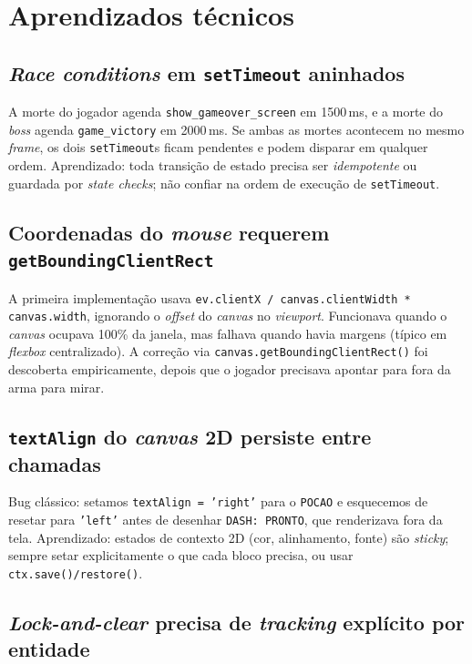 \section{Aprendizados técnicos}

\subsection{\emph{Race conditions} em \texttt{setTimeout} aninhados}

A morte do jogador agenda \texttt{show\_gameover\_screen} em 1500\,ms, e a morte
do \emph{boss} agenda \texttt{game\_victory} em 2000\,ms. Se ambas as mortes
acontecem no mesmo \emph{frame}, os dois \texttt{setTimeout}s ficam pendentes e
podem disparar em qualquer ordem. Aprendizado: toda transição de estado precisa
ser \emph{idempotente} ou guardada por \emph{state checks}; não confiar na ordem
de execução de \texttt{setTimeout}.

\subsection{Coordenadas do \emph{mouse} requerem \texttt{getBoundingClientRect}}

A primeira implementação usava \texttt{ev.clientX / canvas.clientWidth *
canvas.width}, ignorando o \emph{offset} do \emph{canvas} no \emph{viewport}.
Funcionava quando o \emph{canvas} ocupava 100\% da janela, mas falhava quando
havia margens (típico em \emph{flexbox} centralizado). A correção via
\texttt{canvas.getBoundingClientRect()} foi descoberta empiricamente, depois que
o jogador precisava apontar para fora da arma para mirar.

\subsection{\texttt{textAlign} do \emph{canvas} 2D persiste entre chamadas}

Bug clássico: setamos \texttt{textAlign = 'right'} para o \texttt{POCAO} e
esquecemos de resetar para \texttt{'left'} antes de desenhar
\texttt{DASH: PRONTO}, que renderizava fora da tela. Aprendizado: estados de
contexto 2D (cor, alinhamento, fonte) são \emph{sticky}; sempre setar
explicitamente o que cada bloco precisa, ou usar
\texttt{ctx.save()/restore()}.

\subsection{\emph{Lock-and-clear} precisa de \emph{tracking} explícito por entidade}

